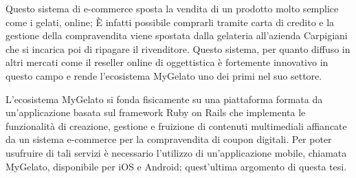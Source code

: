 Questo sistema di e-commerce sposta la vendita di un prodotto molto semplice come i gelati, online; È infatti possibile comprarli tramite carta di credito e la gestione della compravendita viene spostata dalla gelateria all'azienda Carpigiani che si incarica poi di ripagare il rivenditore.
Questo sistema, per quanto diffuso in altri mercati come il reseller online di oggettistica è fortemente innovativo in questo campo e rende l'ecosistema MyGelato uno dei primi nel suo settore.

L'ecosistema MyGelato si fonda fisicamente su una piattaforma formata da un’applicazione basata sul framework Ruby on Rails che implementa le funzionalità di creazione, gestione e fruizione di contenuti multimediali affiancate da un sistema e-commerce per la compravendita di coupon digitali.
Per poter usufruire di tali servizi è necessario l'utilizzo di un'applicazione mobile, chiamata MyGelato, disponibile per iOS e Android; quest'ultima argomento di questa tesi.

\newpage